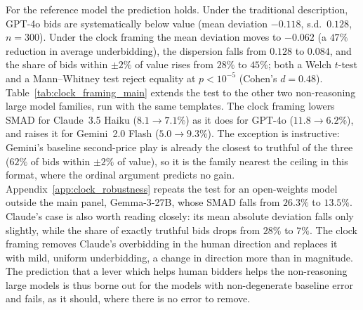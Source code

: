 \documentclass[acmsmall,screen,review]{acmart}
\begin{document}
For the reference model the prediction holds. Under the traditional description, GPT-4o bids are systematically below value (mean deviation $-0.118$, s.d.\ $0.128$, $n=300$). Under the clock framing the mean deviation moves to $-0.062$ (a $47\%$ reduction in average underbidding), the dispersion falls from $0.128$ to $0.084$, and the share of bids within $\pm 2\%$ of value rises from $28\%$ to $45\%$; both a Welch $t$-test and a Mann--Whitney test reject equality at $p<10^{-5}$ (Cohen's $d=0.48$). Table~\ref{tab:clock_framing_main} extends the test to the other two non-reasoning large model families, run with the same templates. The clock framing lowers SMAD for Claude~3.5 Haiku ($8.1\to7.1\%$) as it does for GPT-4o ($11.8\to6.2\%$), and raises it for Gemini~2.0 Flash ($5.0\to9.3\%$). The exception is instructive: Gemini's baseline second-price play is already the closest to truthful of the three ($62\%$ of bids within $\pm 2\%$ of value), so it is the family nearest the ceiling in this format, where the ordinal argument predicts no gain. Appendix~\ref{app:clock_robustness} repeats the test for an open-weights model outside the main panel, Gemma-3-27B, whose SMAD falls from $26.3\%$ to $13.5\%$. Claude's case is also worth reading closely: its mean absolute deviation falls only slightly, while the share of exactly truthful bids drops from $28\%$ to $7\%$. The clock framing removes Claude's overbidding in the human direction and replaces it with mild, uniform underbidding, a change in direction more than in magnitude. The prediction that a lever which helps human bidders helps the non-reasoning large models is thus borne out for the models with non-degenerate baseline error and fails, as it should, where there is no error to remove.


\begin{table}[htbp]
\centering
\small
\resizebox{\linewidth}{!}{}
\caption{\textbf{Clock framing of the second-price sealed-bid auction across the three non-reasoning large model families.} SMAD (\%), mean scaled deviation $(b-v)/\mathbb{E}[b^\star]$, and the share of bids within $\pm2\%$ of value under the baseline description (two pooled runs of the standard description) and under the clock framing; $p$-values are Mann--Whitney tests against the same model's baseline. The final column records whether the sign of the effect matches the human evidence of \citet{breitmoser2022obviousness}: $\surd$ if SMAD falls with $p<0.05$, $\times$ otherwise.}
\label{tab:clock_framing_main}
\end{table}
\end{document}
